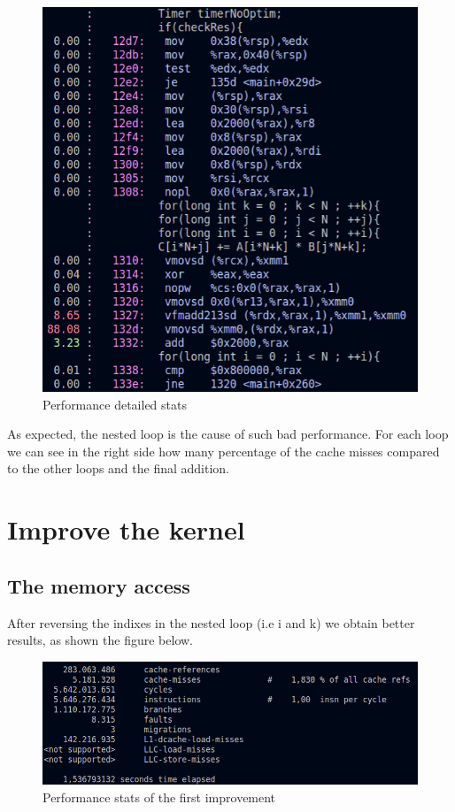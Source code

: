 \documentclass[a4paper, 10 pt, conference]{ieeeconf}
\begin{document}
\begin{figure}[h!]
  \center \includegraphics[scale=0.3]{pics/2.png}
  \caption{Performance detailed stats}
  \label{}
\end{figure}


As expected, the nested loop is the cause of such bad performance. For each loop we can see in the right side how many percentage of the cache misses compared to the other loops and the final addition.


\section{Improve the kernel}
\subsection{The memory access}

After reversing the indixes in the nested loop (i.e i and k) we obtain better results, as shown the figure below.

\begin{figure}[h!]
  \center \includegraphics[scale=0.3]{pics/3.png}
  \caption{Performance stats of the first improvement}
  \label{}
\end{figure}
\end{document}
